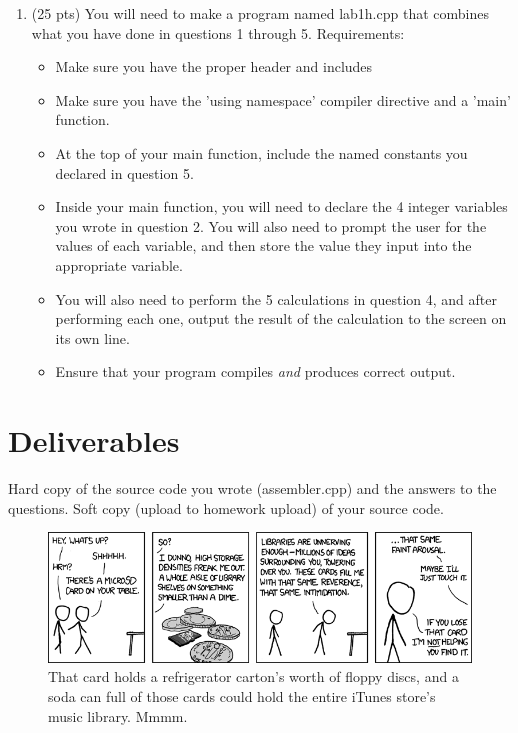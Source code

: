 \documentclass[letterpaper,12pt]{article}
\begin{document}
\begin{enumerate}
    \item (25 pts) You will need to make a program named lab1h.cpp that combines what you have done
          in questions 1 through 5. Requirements:
            \begin{itemize}
                \item Make sure you have the proper header and includes
                \item Make sure you have the 'using namespace' compiler directive and a 'main' function.
                \item At the top of your main function, include the named constants you declared in question 5.
                \item Inside your main function, you will need to declare the 4 integer variables
                      you wrote in question 2. You will also need to prompt the user for the values of
                      each variable, and then store the value they input into the appropriate variable.
                \item You will also need to perform the 5 calculations in question 4, and after performing
                      each one, output the result of the calculation to the screen on its own line.
                \item Ensure that your program compiles \emph{and} produces correct output.
            \end{itemize}
\end{enumerate}
\section*{Deliverables}
Hard copy of the source code you wrote (assembler.cpp) and the answers to the questions.
Soft copy (upload to homework upload) of your source code.

\begin{figure}[ht!]
	\centering
	\includegraphics[width=5in]{microsd.png}
\caption*{That card holds a refrigerator carton's worth of floppy discs, and a soda can full
          of those cards could hold the entire iTunes store's music library. Mmmm.}
\end{figure}
\end{document}
